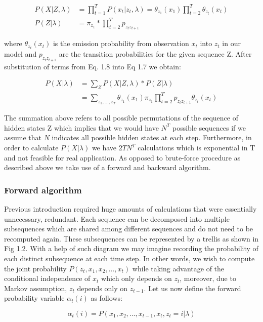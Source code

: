 \begin{align}
P(X| Z, \lambda) &= \prod_{t=1}^T  P(x_t|z_t,\lambda) = \theta_{z_1}(x_1) \prod_{t=2}^T \theta_{z_t}(x_t) \\ \nonumber
P(Z|\lambda)&= \pi_{z_1} * \prod_{t=2}^{T} p_{z_t z_{t+1}}
\end{align}

where $\theta_{z_t}(x_t)$ is the emission probability from observation $x_t$ into $z_t$ in our model and $p_{z_t z_{t+1}}$ are the transition probabilities for the given sequence Z. After substitution of terms from Eq. 1.8 into Eq 1.7 we obtain:

\begin{align}
P(X| \lambda) &= \sum_Z P(X|Z,\lambda)*P(Z|\lambda) \\ \nonumber
&= \sum_{z_1,\ldots,z_T}\theta_{z_1}(x_1) \pi_{z_1} \prod_{t=2}^{T} p_{z_t z_{t+1}} \theta_{z_t}(x_t)
\end{align}

The summation above refers to all possible permutations of the sequence of hidden states Z which implies that we would have $N^T$ possible sequences if we assume that $N$ indicates all possible hidden states at each step. Furthermore, in order to calculate $P(X|\lambda)$ we have $2TN^T$ calculations which is exponential in T and not feasible for real application. As opposed to brute-force procedure as described above we take use of a forward and backward algorithm. 

\subsubsection{Forward algorithm}

Previous introduction required huge amounts of calculations that were essentially unnecessary, redundant. Each sequence can be decomposed into multiple subsequences which are shared among different sequences and do not need to be recomputed again. These subsequences can be represented by a trellis as shown in Fig 1.2. With a help of such diagram we may imagine recording the probability of each distinct subsequence at each time step. In other words, we wish to compute the joint probability $P(z_t,x_1,x_2,\ldots,x_t)$ while taking advantage of the conditional independence of $x_t$ which only depends on $z_t$, moreover, due to Markov assumption, $z_t$ depends only on $z_{t-1}$. Let us now define the forward probability variable $\alpha_t(i)$ as follows:

 \begin{equation}
\alpha_t(i) = P(x_1,x_2,\ldots,x_{t-1},x_t,z_t=i |\lambda)
\end{equation}

